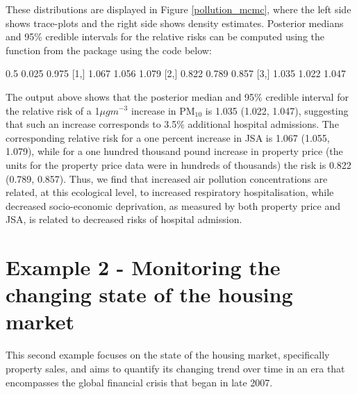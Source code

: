\documentclass[article, nojss]{jss}
\begin{document}
These distributions are displayed in Figure \ref{pollution_mcmc}, where the left side shows trace-plots and the right side shows density estimates. Posterior medians and 95\% credible intervals for the relative risks can be computed using the  function from the  package using the code below:



\begin{CodeOutput}
       0.5 0.025 0.975
[1,] 1.067 1.056 1.079
[2,] 0.822 0.789 0.857
[3,] 1.035 1.022 1.047
\end{CodeOutput}


The output above shows that the posterior median and 95\% credible interval for the relative risk of a 1$\mu gm^{-3}$  increase in PM$_{10}$ is 1.035 (1.022, 1.047), suggesting that such an increase corresponds to 3.5\% additional hospital admissions. The corresponding relative risk for a one percent increase in JSA is 1.067 (1.055, 1.079), while for a one hundred thousand pound increase in  property price (the units for the  property price data were in hundreds of thousands) the risk is 0.822 (0.789, 0.857). Thus, we find that increased air pollution concentrations are related, at this ecological level, to increased respiratory hospitalisation, while decreased socio-economic deprivation, as measured by both property price and JSA, is related to decreased risks of hospital admission.





\section{Example 2 - Monitoring the changing state of the housing market}
This second example focuses on the state of the housing market, specifically property sales, and aims to quantify its changing trend over time in an era that encompasses the global financial crisis that began in late 2007. 
\end{document}
